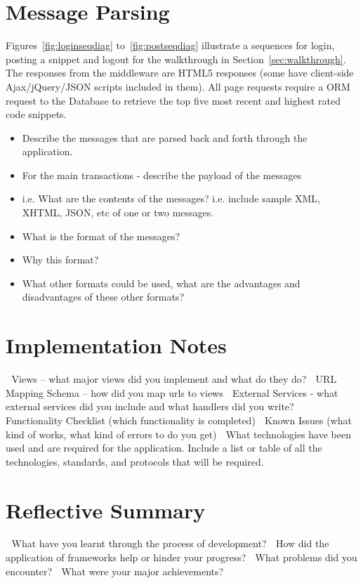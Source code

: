 \documentclass{sig-alt-release2}
\begin{document}
\section{Message Parsing}

Figures~\ref{fig:loginseqdiag} to~\ref{fig:postseqdiag} illustrate a
sequences for login, posting a snippet and logout for the
walkthrough in Section~\ref{sec:walkthrough}. The responses from the
middleware are HTML5 responses (some have client-side Ajax/jQuery/JSON
scripts included in them). All page requests require a ORM request to
the Database to retrieve the top five most recent and highest rated
code snippets.

\begin{itemize}
\item Describe the messages that are parsed back and forth through
the application.
\item	For the main transactions - describe the payload of the messages 
\item	i.e. What are the contents of the messages? i.e. include
sample XML, XHTML, JSON, etc of one or two messages.
\item	What is the format of the messages? 
\item	Why this format? 
\item	What other formats could be used, what are the advantages
and disadvantages of these other formats?
\end{itemize}

\section{Implementation Notes}

	Views – what major views did you implement and what do they do?
	URL Mapping Schema – how did you map urls to views
	External Services  - what external services did you include and what
handlers did you write?
	Functionality Checklist (which functionality is completed)
	Known Issues (what kind of works, what kind of errors to do you get)
	What technologies have been used and are required for the application.
Include a list or table of all the technologies, standards, and protocols
that will be required.

\section{Reflective Summary}

	What have you learnt through the process of development? 
	How did the application of frameworks help or hinder your progress? 
	What problems did you encounter? 
	What were your major achievements?
\end{document}
